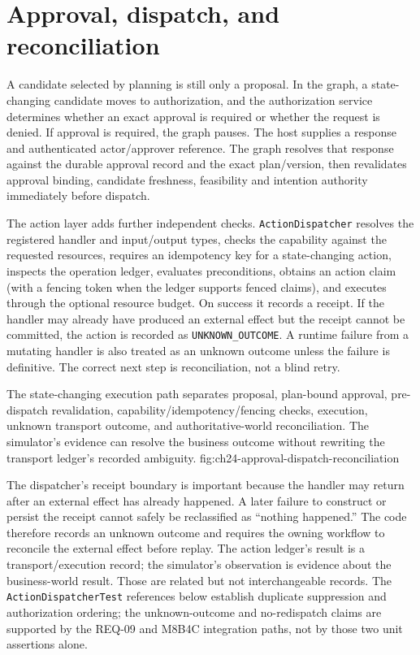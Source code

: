 \section{Approval, dispatch, and reconciliation}
\label{sec:ch24-approval-dispatch-reconcile}

A candidate selected by planning is still only a proposal. In the graph, a state-changing candidate moves to authorization, and the authorization service determines whether an exact approval is required or whether the request is denied. If approval is required, the graph pauses. The host supplies a response and authenticated actor/approver reference. The graph resolves that response against the durable approval record and the exact plan/version, then revalidates approval binding, candidate freshness, feasibility and intention authority immediately before dispatch.

The action layer adds further independent checks. \texttt{ActionDispatcher} resolves the registered handler and input/output types, checks the capability against the requested resources, requires an idempotency key for a state-changing action, inspects the operation ledger, evaluates preconditions, obtains an action claim (with a fencing token when the ledger supports fenced claims), and executes through the optional resource budget. On success it records a receipt. If the handler may already have produced an external effect but the receipt cannot be committed, the action is recorded as \texttt{UNKNOWN\_OUTCOME}. A runtime failure from a mutating handler is also treated as an unknown outcome unless the failure is definitive. The correct next step is reconciliation, not a blind retry.

  {The state-changing execution path separates proposal, plan-bound approval, pre-dispatch revalidation, capability/idempotency/fencing checks, execution, unknown transport outcome, and authoritative-world reconciliation. The simulator's evidence can resolve the business outcome without rewriting the transport ledger's recorded ambiguity.}
  {fig:ch24-approval-dispatch-reconciliation}

The dispatcher's receipt boundary is important because the handler may return after an external effect has already happened. A later failure to construct or persist the receipt cannot safely be reclassified as “nothing happened.” The code therefore records an unknown outcome and requires the owning workflow to reconcile the external effect before replay. The action ledger's result is a transport/execution record; the simulator's observation is evidence about the business-world result. Those are related but not interchangeable records. The \texttt{ActionDispatcherTest} references below establish duplicate suppression and authorization ordering; the unknown-outcome and no-redispatch claims are supported by the REQ-09 and M8B4C integration paths, not by those two unit assertions alone.

